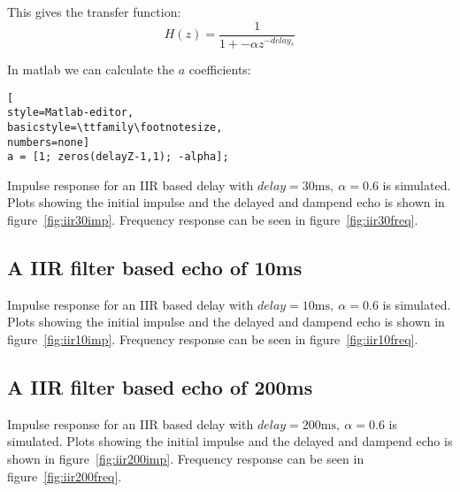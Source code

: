 This gives the transfer function:
\begin{equation*}
H(z) = \frac{1}{1 + -\alpha z^{-delay_s}}
\end{equation*}

In matlab we can calculate the $a$ coefficients:
\begin{lstlisting}[
style=Matlab-editor,
basicstyle=\ttfamily\footnotesize,
numbers=none]
a = [1; zeros(delayZ-1,1); -alpha];
\end{lstlisting}

Impulse response for an IIR based delay with $delay = 30\mbox{ms}, ~ \alpha =
0.6$ is simulated. Plots showing the initial impulse and the delayed and dampend
echo is shown in figure~\ref{fig:iir30imp}. Frequency response can be seen in
figure~\ref{fig:iir30freq}.


\subsection{A IIR filter based echo of 10ms}
Impulse response for an IIR based delay with $delay = 10\mbox{ms}, ~ \alpha =
0.6$ is simulated. Plots showing the initial impulse and the delayed and dampend
echo is shown in figure~\ref{fig:iir10imp}. Frequency response can be seen in
figure~\ref{fig:iir10freq}.


\subsection{A IIR filter based echo of 200ms}
Impulse response for an IIR based delay with $delay = 200\mbox{ms}, ~ \alpha =
0.6$ is simulated. Plots showing the initial impulse and the delayed and
dampend echo is shown in figure~\ref{fig:iir200imp}. Frequency response can be seen in
figure~\ref{fig:iir200freq}.

